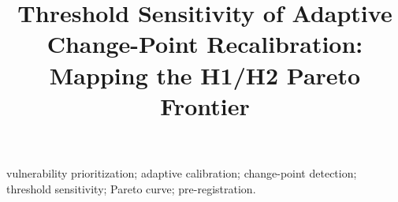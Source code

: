\documentclass[journal]{IEEEtran}
\title{Threshold Sensitivity of Adaptive Change-Point Recalibration:
Mapping the H1/H2 Pareto Frontier}
\author{%
  \IEEEauthorblockN{Harshavardhan Malla}
  \IEEEauthorblockA{Independent Researcher\\
  Harshavardhanmalla75@gmail.com}%
}
\begin{document}
\maketitle

\begin{abstract}

\end{abstract}

\begin{IEEEkeywords}
vulnerability prioritization; adaptive calibration; change-point
detection; threshold sensitivity; Pareto curve; pre-registration.
\end{IEEEkeywords}















\end{document}
